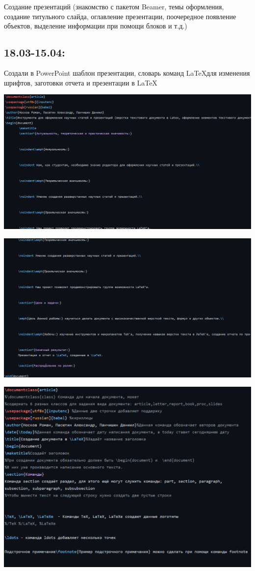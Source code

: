 \documentclass{article}
\begin{document}
	Создание презентаций (знакомство с пакетом Beamer, темы оформления, создание титульного слайда, оглавление презентации, поочередное появление объектов, выделение информации при помощи блоков и т.д.)
	
	\subsection*{18.03-15.04:}
	
	Создали в PowerPoint шаблон презентации, словарь команд \LaTeX для изменения шрифтов, заготовки отчета и презентации в \LaTeX
	
	\includegraphics[width=\linewidth]{1}
	
	
	\includegraphics[width=\linewidth]{2}
	
	
	\includegraphics[width=\linewidth]{3}
	
\end{document}
